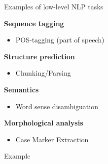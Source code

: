 \begin{vbframe}{Examples of low-level NLP tasks}

\textbf{Sequence tagging}

\begin{itemize}
	\item POS-tagging (part of speech)
\end{itemize}

\textbf{Structure prediction}

\begin{itemize}
	\item Chunking/Parsing
\end{itemize}

\textbf{Semantics}

\begin{itemize}
	\item Word sense disambiguation
\end{itemize}

\textbf{Morphological analysis}

\begin{itemize}
	\item Case Marker Extraction
\end{itemize}


	\begin{exampleblock}{Example}

	\end{exampleblock}
	
\vfill

\end{vbframe}
